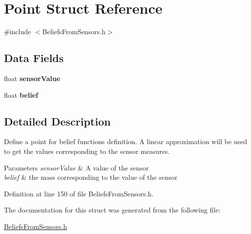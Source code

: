 \hypertarget{struct_point}{
\section{Point Struct Reference}
\label{struct_point}
}


{\ttfamily \#include $<$BeliefsFromSensors.h$>$}

\subsection*{Data Fields}
\begin{DoxyCompactItemize}
\item 
\hypertarget{struct_point_a5b89170903f5d655f0e21e500138425b}{
float {\bfseries sensorValue}}
\label{struct_point_a5b89170903f5d655f0e21e500138425b}

\item 
\hypertarget{struct_point_a6e4486fe342cdfe9f04042b551e1651e}{
float {\bfseries belief}}
\label{struct_point_a6e4486fe342cdfe9f04042b551e1651e}

\end{DoxyCompactItemize}


\subsection{Detailed Description}
Define a point for belief functions definition. A linear approximation will be used to get the values corresponding to the sensor measures. 
\begin{DoxyParams}{Parameters}
{\em sensorValue} & A value of the sensor \\
\hline
{\em belief} & the mass corresponding to the value of the sensor \\
\hline
\end{DoxyParams}


Definition at line 150 of file BeliefsFromSensors.h.



The documentation for this struct was generated from the following file:\begin{DoxyCompactItemize}
\item 
\hyperlink{_beliefs_from_sensors_8h}{BeliefsFromSensors.h}\end{DoxyCompactItemize}
